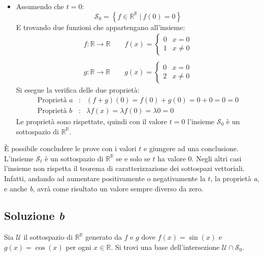 \documentclass[a4paper]{article}
\begin{document}
\begin{itemize}
		\item Assumendo che $t = 0$:
		\begin{equation*}
			\mathscr{S}_{0} = \left\{f \in \mathbb{R^{R}} \: | \: f\left(0\right) = 0\right\}
		\end{equation*}
		E trovando due funzioni che appartengano all'insieme:
		\begin{gather*}
			f : \mathbb{R} \rightarrow \mathbb{R} \hspace{2em} f\left(x\right) = \begin{cases}
				0 & x = 0 \\
				1 & x \ne 0
			\end{cases} \\
			\\
			g : \mathbb{R} \rightarrow \mathbb{R} \hspace{2em} g\left(x\right) = \begin{cases}
				0 & x = 0 \\
				2 & x \ne 0
			\end{cases}
		\end{gather*}
		Si esegue la verifica delle due proprietà:
		\begin{equation*}
			\begin{array}{lll}
				\text{Proprietà }a & : & \left(f + g\right)\left(0\right) = f\left(0\right) + g\left(0\right) = 0+0 = 0 = 0 \\ [0.5em]
				\text{Proprietà }b & : & \lambda f\left(x\right) = \lambda f\left(0\right) = \lambda 0 = 0
			\end{array}
		\end{equation*}
		Le proprietà sono rispettate, quindi con il valore $t = 0$ l'insieme $\mathscr{S}_{0}$ è un sottospazio di $\mathbb{R^{R}}$.
	\end{itemize}
	È possibile concludere le prove con i valori $t$ e giungere ad una conclusione. L'insieme $\mathscr{S}_{t}$ è un sottospazio di $\mathbb{R^{R}}$ se e solo se $t$ ha valore $0$. Negli altri casi l'insieme non rispetta il teorema di caratterizzazione dei sottospazi vettoriali. Infatti, andando ad aumentare positivamente o negativamente la $t$, la proprietà \emph{a}, e anche \emph{b}, avrà come risultato un valore sempre diverso da zero.
	
	\subsection{Soluzione \emph{b}}
	
	Sia $\mathscr{U}$ il sottospazio di $\mathbb{R^{R}}$ generato da $f$ e $g$ dove $f\left(x\right) = \sin\left(x\right)$ e $g\left(x\right) = \cos\left(x\right)$ per ogni $x \in \mathbb{R}$. Si trovi una base dell'intersezione $\mathscr{U} \cap \mathscr{S}_{0}$.\newline
	
\end{document}
